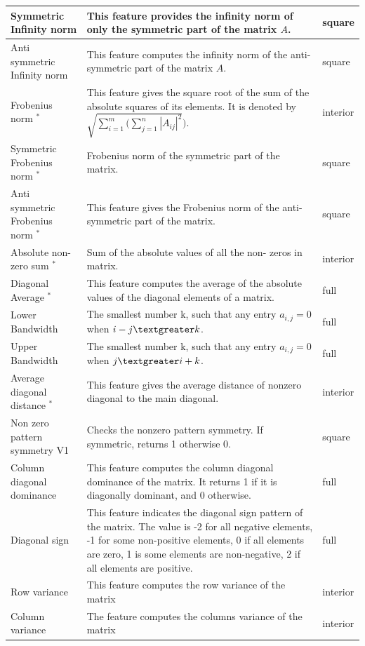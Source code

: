 \begin{table}[htb]
{\begin{tabular}{|p{3.2cm}|p{7.8cm}|p{1cm}|}
Symmetric Infinity norm    &  This feature provides the infinity norm of only the symmetric part of the matrix $A$. &square \\ \hline 
Anti symmetric Infinity norm    &    This feature computes the infinity norm of the anti-symmetric part of the matrix $A$. & square \\ \hline 
Frobenius norm  $^*$           &    This feature gives the square root of the sum of the absolute squares of its elements. It is denoted by $\sqrt{\sum_{i=1}^{m} (\sum_{j=1}^{n} |A_{ij}|^2})$. & interior \\ \hline 
Symmetric Frobenius norm $^*$  &    Frobenius norm of the symmetric part of the matrix. & square \\ \hline 
Anti symmetric Frobenius norm $^*$  &    This feature gives the Frobenius norm of the anti-symmetric part of the matrix. & square \\ \hline 
Absolute non-zero sum  $^*$    &    Sum of the absolute values of all the non- zeros in matrix. & interior \\ \hline 
Diagonal Average $^*$          &    This feature computes the average of the absolute values of the diagonal elements of a matrix. & full \\ \hline 
Lower Bandwidth            &    The smallest number k, such that any entry $a_{i,j} = 0$ when $i - j \textgreater k$. & full \\ \hline 
Upper Bandwidth            &     The smallest number k, such that any entry $a_{i,j} = 0$ when $j \textgreater i + k$. & full \\ \hline 
Average diagonal distance $^*$ &    This feature gives the average distance of nonzero diagonal to the main diagonal. & interior \\ \hline 
Non zero pattern symmetry V1   &    Checks the nonzero pattern symmetry. If symmetric, returns 1 otherwise 0. & square \\ \hline 
Column diagonal dominance  &    This feature computes the column diagonal dominance of the matrix. It returns 1 if it is diagonally dominant, and 0 otherwise. & full \\ \hline 
Diagonal sign              &    This feature indicates the diagonal sign pattern of the matrix. The value is -2 for all negative elements, -1 for some non-positive elements, 0 if all elements are zero, 1 is some elements are non-negative, 2 if all elements are positive. & full \\ \hline 
Row variance               &   This feature computes the row variance of the matrix & interior \\ \hline 
Column variance            &   The feature computes the columns variance of the matrix & interior \\ \hline  
\end{tabular}}
\end{table}

 
